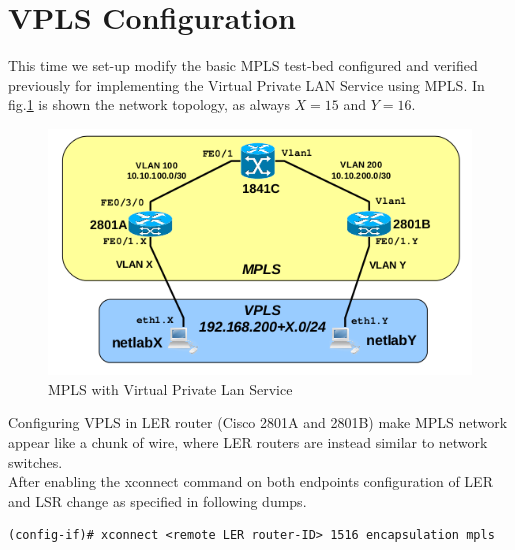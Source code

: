 \documentclass{llncs}
\newcommand{\labelsec}[1]{\label{sec:#1}}
\begin{document}
\newpage
\section{VPLS Configuration}
\labelsec{VPLS_config}

This time we set-up modify the basic MPLS test-bed configured and verified previously for implementing the Virtual Private LAN Service using MPLS. In fig.\ref{fig:mpls2_topology} is shown the network topology, as always $X=15$ and $Y=16$. 

\begin{figure}
\centering
\includegraphics[width=1.0\textwidth]{../e4/topology.png}
\caption{MPLS with Virtual Private Lan Service}
\label{fig:mpls2_topology}
\end{figure}

Configuring VPLS in LER router (Cisco 2801A and 2801B) make MPLS network appear like a chunk of wire, where LER routers are instead similar to network switches.\\
After enabling the xconnect command on both endpoints configuration of LER and LSR change as specified in following dumps.
\begin{verbatim}
(config-if)# xconnect <remote LER router-ID> 1516 encapsulation mpls
\end{verbatim}
\end{document}
